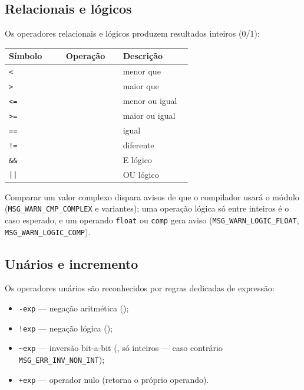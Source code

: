 \subsection{Relacionais e lógicos}

Os operadores relacionais e lógicos produzem resultados inteiros (0/1):

\begin{longtable}{p{0.28\linewidth} p{0.28\linewidth} p{0.34\linewidth}}
\toprule
\textbf{Símbolo} & \textbf{Operação} & \textbf{Descrição} \\
\midrule
\lstinline|<|   &  & menor que \\
\lstinline|>|   &  & maior que \\
\lstinline|<=|  &  & menor ou igual \\
\lstinline|>=|  &  & maior ou igual \\
\lstinline|==|  &  & igual \\
\lstinline|!=|  &  & diferente \\
\lstinline|&&|  &  & E lógico \\
\lstinline+||+ &  & OU lógico \\
\bottomrule
\end{longtable}

Comparar um valor complexo dispara avisos de que o compilador usará o módulo
(\lstinline|MSG_WARN_CMP_COMPLEX| e variantes); uma operação lógica só entre
inteiros é o caso esperado, e um operando \lstinline|float| ou \lstinline|comp|
gera aviso (\lstinline|MSG_WARN_LOGIC_FLOAT|, \lstinline|MSG_WARN_LOGIC_COMP|).

\subsection{Unários e incremento}

Os operadores unários são reconhecidos por regras dedicadas de expressão:

\begin{itemize}[leftmargin=1.5em]
  \item \lstinline|-exp| --- negação aritmética ();
  \item \lstinline|!exp| --- negação lógica ();
  \item \lstinline|~exp| --- inversão bit-a-bit (, só inteiros ---
  caso contrário \lstinline|MSG_ERR_INV_NON_INT|);
  \item \lstinline|+exp| --- operador nulo (retorna o próprio operando).
\end{itemize}

